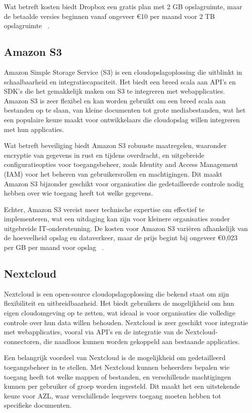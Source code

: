 Wat betreft kosten biedt Dropbox een gratis plan met 2 GB opslagruimte, maar de betaalde versies beginnen vanaf ongeveer €10 per maand voor 2 TB opslagruimte ~\autocite{Dropbox2024}.

\subsection{Amazon S3}
Amazon Simple Storage Service (S3) is een cloudopslagoplossing die uitblinkt in schaalbaarheid en integratiecapaciteit. Het biedt een breed scala aan API's en SDK's die het gemakkelijk maken om S3 te integreren met webapplicaties. Amazon S3 is zeer flexibel en kan worden gebruikt om een breed scala aan bestanden op te slaan, van kleine documenten tot grote mediabestanden, wat het een populaire keuze maakt voor ontwikkelaars die cloudopslag willen integreren met hun applicaties.

Wat betreft beveiliging biedt Amazon S3 robuuste maatregelen, waaronder encryptie van gegevens in rust en tijdens overdracht, en uitgebreide configuratieopties voor toegangsbeheer, zoals Identity and Access Management (IAM) voor het beheren van gebruikersrollen en machtigingen. Dit maakt Amazon S3 bijzonder geschikt voor organisaties die gedetailleerde controle nodig hebben over wie toegang heeft tot welke gegevens.

Echter, Amazon S3 vereist meer technische expertise om effectief te implementeren, wat een uitdaging kan zijn voor kleinere organisaties zonder uitgebreide IT-ondersteuning. De kosten voor Amazon S3 variëren afhankelijk van de hoeveelheid opslag en dataverkeer, maar de prijs begint bij ongeveer €0,023 per GB per maand voor opslag ~\autocite{AWS2024}.

\subsection{Nextcloud}
Nextcloud is een open-source cloudopslagoplossing die bekend staat om zijn flexibiliteit en uitbreidbaarheid. Het biedt gebruikers de mogelijkheid om hun eigen cloudomgeving op te zetten, wat ideaal is voor organisaties die volledige controle over hun data willen behouden. Nextcloud is zeer geschikt voor integratie met webapplicaties, vooral via API's en de integratie van de Nextcloud-connectoren, die naadloos kunnen worden gekoppeld aan bestaande applicaties.

Een belangrijk voordeel van Nextcloud is de mogelijkheid om gedetailleerd toegangsbeheer in te stellen. Met Nextcloud kunnen beheerders bepalen wie toegang heeft tot welke mappen of bestanden, en verschillende machtigingen kunnen per gebruiker of groep worden ingesteld. Dit maakt het een uitstekende keuze voor AZL, waar verschillende lesgevers toegang moeten hebben tot specifieke documenten.

